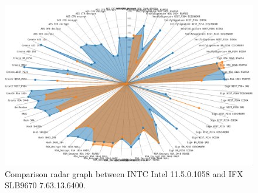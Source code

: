 \begin{landscape}
\begin{figure}[!t]
    \centering
    \includegraphics[width=\linewidth]{img/visualizations/INTC_Intel_11.5.0.1058_vs_IFX_SLB9670_7.63.13.6400-radar-comparison.png}
    \caption{
    Comparison radar graph between INTC Intel 11.5.0.1058 and IFX SLB9670 7.63.13.6400.
    }
\end{figure}
\end{landscape}

